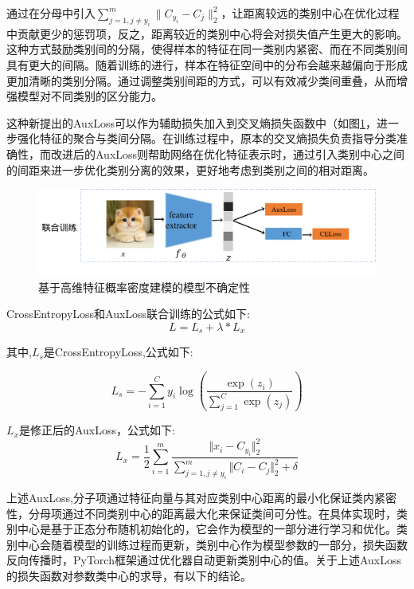 通过在分母中引入$\sum_{j=1, j \neq y_i}^{m} \|C_{y_i} - C_j\|_2^2$，让距离较远的类别中心在优化过程中贡献更少的惩罚项，反之，距离较近的类别中心将会对损失值产生更大的影响。这种方式鼓励类别间的分隔，使得样本的特征在同一类别内紧密、而在不同类别间具有更大的间隔。随着训练的进行，样本在特征空间中的分布会越来越偏向于形成更加清晰的类别分隔。通过调整类别间距的方式，可以有效减少类间重叠，从而增强模型对不同类别的区分能力。

这种新提出的AuxLoss可以作为辅助损失加入到交叉熵损失函数中（如图\ref{tag:模型结构图2}，进一步强化特征的聚合与类间分隔。在训练过程中，原本的交叉熵损失负责指导分类准确性，而改进后的AuxLoss则帮助网络在优化特征表示时，通过引入类别中心之间的间距来进一步优化类别分离的效果，更好地考虑到类别之间的相对距离。


\begin{figure}[h]
    \centering
    \includegraphics[width=1.\linewidth]{assets/structure2.png}
    \caption{基于高维特征概率密度建模的模型不确定性}
    \label{tag:模型结构图2}
\end{figure}


CrossEntropyLoss和AuxLoss联合训练的公式如下:
\begin{equation}
    L = L_s+\lambda * L_x
\end{equation}

其中,$L_s$是CrossEntropyLoss,公式如下:

\begin{equation}
    L_s= - \sum_{i=1}^C y_i \log\left(\frac{\exp(z_i)}{\sum_{j=1}^C \exp(z_j)}\right)
\end{equation}

$L_x$是修正后的AuxLoss，公式如下:
\begin{equation}
    L_x = \frac{1}{2}\sum_{i=1}^{m} \frac{\Vert x_i-C_{y_i}\Vert_2^2}{\sum_{j=1,j\neq y_i}^{m}\Vert C_i-C_j\Vert_2^2+\delta}
\end{equation}

上述AuxLoss,分子项通过特征向量与其对应类别中心距离的最小化保证类内紧密性，分母项通过不同类别中心的距离最大化来保证类间可分性。在具体实现时，类别中心是基于正态分布随机初始化的，它会作为模型的一部分进行学习和优化。类别中心会随着模型的训练过程而更新，类别中心作为模型参数的一部分，损失函数反向传播时，PyTorch框架通过优化器自动更新类别中心的值。关于上述AuxLoss的损失函数对参数类中心的求导，有以下的结论。

